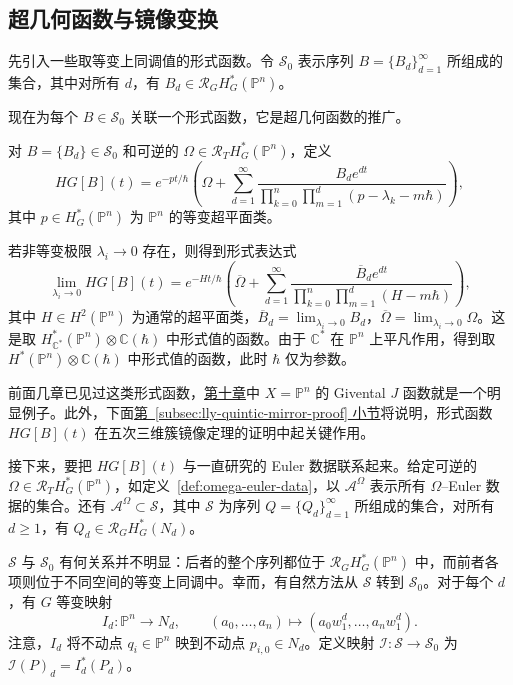 \subsection{超几何函数与镜像变换}\label{subsec:hypergeometric-mirror-transformations}
先引入一些取等变上同调值的形式函数。令 $\mathcal S_0$ 表示序列 $B=\{B_d\}_{d=1}^{\infty}$ 所组成的集合，其中对所有 $d$，有 $B_d\in\mathcal R_GH_G^*(\mathbb P^n)$。

现在为每个 $B\in\mathcal S_0$ 关联一个形式函数，它是超几何函数的推广。
\begin{definition}\label{def:euler-data-hypergeometric-function}
对 $B=\{B_d\}\in\mathcal S_0$ 和可逆的 $\Omega\in\mathcal R_TH_G^*(\mathbb P^n)$，定义
\[
HG[B](t)=e^{-pt/\hbar}\left(\Omega+\sum_{d=1}^{\infty}
\frac{B_de^{dt}}{\prod_{k=0}^n\prod_{m=1}^d(p-\lambda_k-m\hbar)}\right),
\]
其中 $p\in H_G^*(\mathbb P^n)$ 为 $\mathbb P^n$ 的等变超平面类。
\end{definition}
若非等变极限 $\lambda_i\to0$ 存在，则得到形式表达式
\[
\lim_{\lambda_i\to0}HG[B](t)
=e^{-Ht/\hbar}\left(\overline\Omega+\sum_{d=1}^{\infty}
\frac{\overline B_de^{dt}}{\prod_{k=0}^n\prod_{m=1}^d(H-m\hbar)}\right),
\]
其中 $H\in H^2(\mathbb P^n)$ 为通常的超平面类，$\overline B_d=\lim_{\lambda_i\to0}B_d$，$\overline\Omega=\lim_{\lambda_i\to0}\Omega$。这是取 $H_{\mathbb C^*}^*(\mathbb P^n)\otimes\mathbb C(\hbar)$ 中形式值的函数。由于 $\mathbb C^*$ 在 $\mathbb P^n$ 上平凡作用，得到取 $H^*(\mathbb P^n)\otimes\mathbb C(\hbar)$ 中形式值的函数，此时 $\hbar$ 仅为参数。

前面几章已见过这类形式函数，\hyperref[chap:quantum-differential-equations]{第十章}中 $X=\mathbb P^n$ 的 Givental $J$ 函数就是一个明显例子。此外，下面\hyperref[subsec:lly-quintic-mirror-proof]{第~\ref*{subsec:lly-quintic-mirror-proof} 小节}将说明，形式函数 $HG[B](t)$ 在五次三维簇镜像定理的证明中起关键作用。

接下来，要把 $HG[B](t)$ 与一直研究的 Euler 数据联系起来。给定可逆的 $\Omega\in\mathcal R_TH_G^*(\mathbb P^n)$，如定义~\ref{def:omega-euler-data}，以 $\mathcal A^\Omega$ 表示所有 $\Omega$--Euler 数据的集合。还有 $\mathcal A^\Omega\subset\mathcal S$，其中 $\mathcal S$ 为序列 $Q=\{Q_d\}_{d=1}^{\infty}$ 所组成的集合，对所有 $d\ge1$，有 $Q_d\in\mathcal R_GH_G^*(N_d)$。

$\mathcal S$ 与 $\mathcal S_0$ 有何关系并不明显：后者的整个序列都位于 $\mathcal R_GH_G^*(\mathbb P^n)$ 中，而前者各项则位于不同空间的等变上同调中。幸而，有自然方法从 $\mathcal S$ 转到 $\mathcal S_0$。对于每个 $d$，有 $G$ 等变映射
\begin{equation}\label{eq:euler-data-restriction-embedding}
I_d:\mathbb P^n\longrightarrow N_d,\qquad
(a_0,\ldots,a_n)\longmapsto(a_0w_1^d,\ldots,a_nw_1^d).
\end{equation}
注意，$I_d$ 将不动点 $q_i\in\mathbb P^n$ 映到不动点 $p_{i,0}\in N_d$。定义映射 $\mathcal I:\mathcal S\to\mathcal S_0$ 为 $\mathcal I(P)_d=I_d^*(P_d)$。

